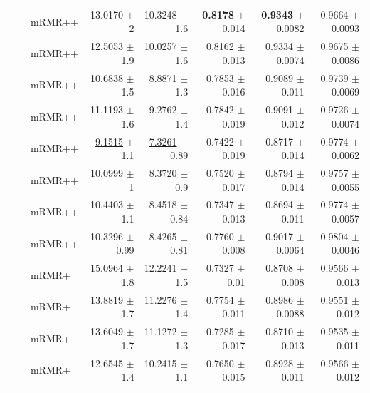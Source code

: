 \begin{longtable}{llp{}rrrrr}
 &  & mRMR++ & 13.0170 {\scriptsize $\pm$ 2} & 10.3248 {\scriptsize $\pm$ 1.6} & \textbf{0.8178} {\scriptsize $\pm$ 0.014} & \textbf{0.9343} {\scriptsize $\pm$ 0.0082} & 0.9664 {\scriptsize $\pm$ 0.0093} \\
 &  & mRMR++ & 12.5053 {\scriptsize $\pm$ 1.9} & 10.0257 {\scriptsize $\pm$ 1.6} & \underline{0.8162} {\scriptsize $\pm$ 0.013} & \underline{0.9334} {\scriptsize $\pm$ 0.0074} & 0.9675 {\scriptsize $\pm$ 0.0086} \\
 &  & mRMR++ & 10.6838 {\scriptsize $\pm$ 1.5} & 8.8871 {\scriptsize $\pm$ 1.3} & 0.7853 {\scriptsize $\pm$ 0.016} & 0.9089 {\scriptsize $\pm$ 0.011} & 0.9739 {\scriptsize $\pm$ 0.0069} \\
 &  & mRMR++ & 11.1193 {\scriptsize $\pm$ 1.6} & 9.2762 {\scriptsize $\pm$ 1.4} & 0.7842 {\scriptsize $\pm$ 0.019} & 0.9091 {\scriptsize $\pm$ 0.012} & 0.9726 {\scriptsize $\pm$ 0.0074} \\
 &  & mRMR++ & \underline{9.1515} {\scriptsize $\pm$ 1.1} & \underline{7.3261} {\scriptsize $\pm$ 0.89} & 0.7422 {\scriptsize $\pm$ 0.019} & 0.8717 {\scriptsize $\pm$ 0.014} & 0.9774 {\scriptsize $\pm$ 0.0062} \\
 &  & mRMR++ & 10.0999 {\scriptsize $\pm$ 1} & 8.3720 {\scriptsize $\pm$ 0.9} & 0.7520 {\scriptsize $\pm$ 0.017} & 0.8794 {\scriptsize $\pm$ 0.014} & 0.9757 {\scriptsize $\pm$ 0.0055} \\
 &  & mRMR++ & 10.4403 {\scriptsize $\pm$ 1.1} & 8.4518 {\scriptsize $\pm$ 0.84} & 0.7347 {\scriptsize $\pm$ 0.013} & 0.8694 {\scriptsize $\pm$ 0.011} & 0.9774 {\scriptsize $\pm$ 0.0057} \\
 &  & mRMR++ & 10.3296 {\scriptsize $\pm$ 0.99} & 8.4265 {\scriptsize $\pm$ 0.81} & 0.7760 {\scriptsize $\pm$ 0.008} & 0.9017 {\scriptsize $\pm$ 0.0064} & 0.9804 {\scriptsize $\pm$ 0.0046} \\
 &  & mRMR+ & 15.0964 {\scriptsize $\pm$ 1.8} & 12.2241 {\scriptsize $\pm$ 1.5} & 0.7327 {\scriptsize $\pm$ 0.01} & 0.8708 {\scriptsize $\pm$ 0.008} & 0.9566 {\scriptsize $\pm$ 0.013} \\
 &  & mRMR+ & 13.8819 {\scriptsize $\pm$ 1.7} & 11.2276 {\scriptsize $\pm$ 1.4} & 0.7754 {\scriptsize $\pm$ 0.011} & 0.8986 {\scriptsize $\pm$ 0.0088} & 0.9551 {\scriptsize $\pm$ 0.012} \\
 &  & mRMR+ & 13.6049 {\scriptsize $\pm$ 1.7} & 11.1272 {\scriptsize $\pm$ 1.3} & 0.7285 {\scriptsize $\pm$ 0.017} & 0.8710 {\scriptsize $\pm$ 0.013} & 0.9535 {\scriptsize $\pm$ 0.011} \\
 &  & mRMR+ & 12.6545 {\scriptsize $\pm$ 1.4} & 10.2415 {\scriptsize $\pm$ 1.1} & 0.7650 {\scriptsize $\pm$ 0.015} & 0.8928 {\scriptsize $\pm$ 0.011} & 0.9566 {\scriptsize $\pm$ 0.012} \\

\end{longtable}

